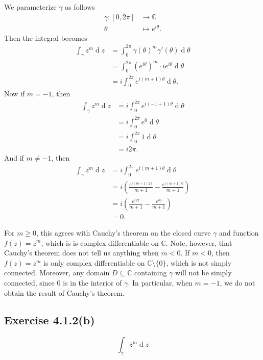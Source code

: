 \documentclass[12pt]{article}
\newenvironment{problem}
    {\begin{lrbox}{\mybox}\begin{minipage}{0.98\textwidth}}
    {\end{minipage}\end{lrbox}\framebox[\textwidth]{\usebox{\mybox}}}
\newcommand{\C}{\mathbb{C}} %
\newcommand{\<}{\left\langle} %
\renewcommand{\>}{\right\rangle} %
\renewcommand{\d}[1]{\operatorname{d}\!#1} %
\let\conj\overline %
\begin{document}
We parameterize $\gamma$ as follows
\begin{align*}
    \gamma:[0,2\pi] &\to \C \\
        \theta &\mapsto e^{i\theta}.
\end{align*}
Then the integral becomes
\begin{align*}
    \int_\gamma z^m \d{z}
        &= \int_0^{2\pi}\gamma(\theta)^m\gamma'(\theta) \d{\theta} \\
        &= \int_0^{2\pi} (e^{i\theta})^m\cdot ie^{i\theta} \d{\theta} \\
        &= i\int_0^{2\pi} e^{i(m+1)\theta} \d{\theta}.
\end{align*}
Now if $m=-1$, then
\begin{align*}
    \int_\gamma z^m \d{z}
        &= i\int_0^{2\pi} e^{i(-1+1)\theta} \d{\theta} \\
        &= i\int_0^{2\pi} e^{0} \d{\theta}\\
        &= i\int_0^{2\pi} 1 \d{\theta}\\
        &= i2\pi.
\end{align*}
And if $m\ne-1$, then
\begin{align*}
    \int_\gamma z^m \d{z}
        &= i\int_0^{2\pi} e^{i(m+1)\theta} \d{\theta} \\
        &= i\left(\frac{e^{i(m+1)2\pi}}{m+1} -  \frac{e^{i(m+1)0}}{m+1}\right)\\
        &= i\left(\frac{e^{i2\pi}}{m+1} -  \frac{e^{i0}}{m+1}\right)\\
        &= 0.
\end{align*}

For $m\geq0$, this agrees with Cauchy's theorem on the closed curve $\gamma$ and function $f(z)=z^m$, which is is complex differentiable on $\C$. Note, however, that Cauchy's theorem does not tell us anything when $m<0$. If $m<0$, then $f(z)=z^m$ is only complex differentiable on $\C\setminus\{0\}$, which is not simply connected. Moreover, any domain $D\subseteq\C$ containing $\gamma$ will not be simply connected, since $0$ is in the interior of $\gamma$. In particular, when $m=-1$, we do not obtain the result of Cauchy's theorem.

\subsection*{Exercise 4.1.2(b)}
\begin{problem}
    \[\int_\gamma\conj{z}^m \d{z}\]
\end{problem}
\medskip
\end{document}
